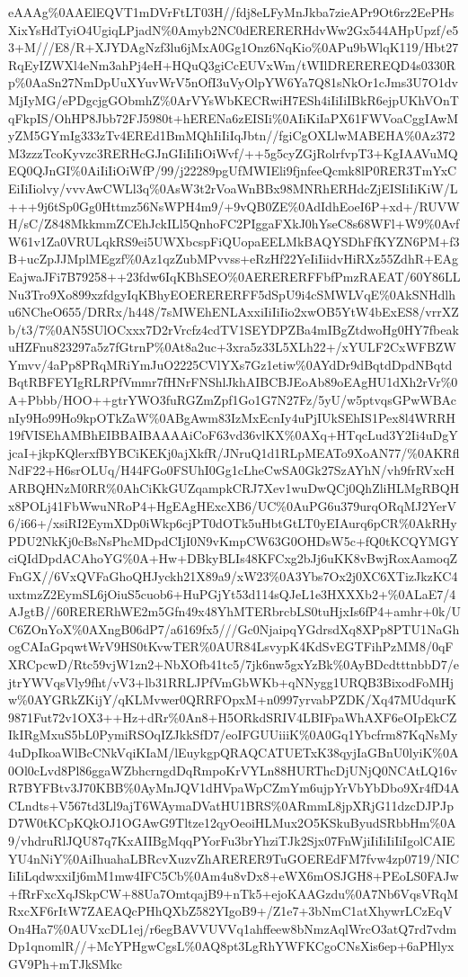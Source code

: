 \documentclass[]{article}
\begin{document}
eAAAg\%0AAElEQVT1mDVrFtLT03H//fdj8eLFyMnJkba7zieAPr9Ot6rz2EePHsXixYsHdTyiO4UgiqLPjadN\%0Amyb2NC0dERERERHdvWw2Gx544AHpUpzf/e53+M///E8/R+XJYDAgNzf3lu6jMxA0Gg1Onz6NqKio\%0APu9bWlqK119/Hbt27RqEyIZWXl4eNm3ahPj4eH+HQuQ3giCcEUVxWm/tWIlDREREREQD4s0330Rp\%0AaSn27NmDpUuXYuvWrV5nOfI3uVyOlpYW6Ya7Q81sNkOr1cJms3U7O1dvMjIyMG/ePDgcjgGObmhZ\%0ArVYsWbKECRwiH7ESh4iIiIiIBkR6ejpUKhVOnTqFkpIS/OhHP8Jbb72FJ5980t+hERENa6zEISIi\%0AIiKiIaPX61FWVoaCggIAwMyZM5GYmIg333zTv4EREd1BmMQhIiIiIqJbtn//fgiCgOXLlwMABEHA\%0Az372M3zzzTcoKyvzc3RERHcGJnGIiIiIiOiWvf/++5g5cyZGjRolrfvpT3+KgIAAVuMQEQ0QJnGI\%0AiIiIiOiWfP/99/j22289pgUfMWIEli9fjnfeeQcmk8lP0RER3TmYxCEiIiIiolvy/vvvAwCWLl3q\%0AsW3t2rVoaWnBBx98MNRhERHdcZjEISIiIiKiW/L+++9j6tSp0Gg0Httmz56NsWPH4m9/+9vQB0ZE\%0AdIdhEoeI6P+xd+/RUVWH/sC/Z848MkkmmZCEhJckILl5QnhoFC2PIggaFXkJ0hYseC8s68WFl+W9\%0AvfW61v1Za0VRULqkRS9ei5UWXbcspFiQUopaEELMkBAQYSDhFfKYZN6PM+f3B+ucZpJJMplMEgzf\%0Az1qzZubMPvvss+eRzHf22YeIiIiidvHiRXz55ZdhR+EAgEajwaJFi7B79258++23fdw6IqKBhSEO\%0AERERERFFbfPmzRAEAT/60Y86LLNu3Tro9Xo899xzfdgyIqKBhyEOERERERFF5dSpU9i4cSMWLVqE\%0AkSNHdlhu6NCheO655/DRRx/h448/7sMWEhENLAxxiIiIiIio2xwOB5YtW4bExES8/vrrXZb/t3/7\%0AN5SUlOCxxx7D2rVrcfz4cdTV1SEYDPZBa4mIBgZtdwoHg0HY7fbeakuHZFnu823297a5z7fGtrnP\%0At8a2uc+3xra5z33L5XLh22+/xYULF2CxWFBZWYmvv/4aPp8PRqMRiYmJuO2225CVlYXs7Gz1etiw\%0AYdDr9dBqtdDpdNBqtdBqtRBFEYIgRLRPfVmmr7fHNrFNShlJkhAIBCBJEoAb89oEAgHU1dXh2rVr\%0A+Pbbb/HOO++gtrYWO3fuRGZmZpf1Go1G7N27Fz/5yU/w5ptvqsGPwWBAcnIy9Ho99Ho9kpOTkZaW\%0ABgAwm83IzMxEcnIy4uPjIUkSEhIS1Pex8l4WRRH19fVISEhAMBhEIBBAIBAAAAiCoF63vd36vlKX\%0AXq+HTqcLud3Y2Ii4uDgYjcaI+jkpKQlerxfBYBCiKEKj0ajXkfR/JNruQ1d1RLpMEATo9XoAN77/\%0AKRflNdF22+H6srOLUq/H44FGo0FSUhI0Gg1cLheCwSA0Gk27SzAYhN/vh9frRVxcHARBQHNzM0RR\%0AhCiKkGUZqampkCRJ7Xev1wuDwQCj0QhZliHLMgRBQHx8POLj41FbWwuNRoP4+HgEAgHExcXB6/UC\%0AuPG6u379urqORqMJ2YerV6/i66+/xsiRI2EymXDp0iWkp6cjPT0dOTk5uHbtGtLT0yEIAurq6pCR\%0AkRHyPDU2NkKj0cBsNsPhcMDpdCIjI0N9vKmpCW63G0OHDsW5c+fQ0tKCQYMGYciQIdDpdACAhoYG\%0A+Hw+DBkyBLIs48KFCxg2bJj6uKK8vBwjRoxAamoqZFnGX//6VxQVFaGhoQHJyckh21X89a9/xW23\%0A3Ybs7Ox2j0XC6XTizJkzKC4uxtmzZ2EymSL6jOiuS5cuob6+HuPGjYt53d114sQJeL1e3HXXXb2+\%0ALaE7/4AJgtB//60RERERhWE2m5Gfn49x48YhMTERbrcbLS0tuHjxIs6fP4+amhr+0k/UC6ZOnYoX\%0AXngB06dP7/a6169fx5///Gc0NjaipqYGdrsdXq8XPp8PTU1NaGhogCAIaGpqwtWrV9HS0tKvwTER\%0AUR84LsvypK4KdSvEGTFihPzMM8/0qFXRCpcwD/Rtc59vjW1zn2+NbXOfb41tc5/7jk6nw5gxYzBk\%0AyBDcdtttnbbD7/ejtrYWVqsVly9fht/vV3+lb31RRLJPfVmGbWKb+qNNygg1URQB3BixodFoMHjw\%0AYGRkZKijY/qKLMvwer0QRRFOpxM+n0997yrvabPZDK/Xq47MUdqurK9871Fut72v1OX3++Hz+dRr\%0An8+H5ORkdSRIV4LBIFpaWhAXF6eOIpEkCZIkIRgMxuS5bL0PymiRSOqIZJkkSfD7/eoIFGUUiiiK\%0A0Gq1Ybcfrm87KqNsMy4uDpIkoaWlBcCNkVqiKIaM/lEuykgpQRAQCATUETxK38qyjIaGBnU0lyiK\%0A0Ol0cLvd8Pl86ggaWZbhcrngdDqRmpoKrVYLn88HURThcDjUNjQ0NCAtLQ16vR7BYFBtv3J70KBB\%0AyMnJQV1dHVpaWpCZmYm6ujpYrVbYbDbo9Xr4fD4ACLndts+V567td3Ll9ajT6WAymaDVatHU1BRS\%0ARmmL8jpXRjG11dzcDJPJpD7W0tKCpKQkOJ1OGAwG9Tltze12qyOeoiHLMux2O5KSkuByudSRbbHm\%0A9/vhdruRlJQU87q7KxAIIBgMqqPYorFu3brYhziTJk2Sjx07FnWjiIiIiIiIiIgolCAIEYU4nNiY\%0AiIhuahaLBRcvXuzvZhARERER9TuGOEREdFM7fvw4zp0719/NICIiIiLqdwxxiIj6mM1mw4IFC5Cb\%0Am4u8vDx8+eWX6mOSJGH8+PEoLS0FAJw+fRrFxcXqJSkpCW+88Ua7OmtqajB9+nTk5+ejoKAAGzdu\%0A7Nb6VqsVRqMRxcXF6rItW7ZAEAQcPHhQXbZ582YIgoB9+/Z1e7+3bNmC1atXhywrLCzEqVOn4Ha7\%0AUVxcDL1ej/r6egBAVVUVVq1ahffeew8bNmzAqlWrcO3atQ7rd7vdmDp1qnomlR//+McYPHgwCgsL\%0AQ8pt3LgRhYWFKCgoCNsXis6ep+6aPHlyxGV9Ph+mTJkSMkc
\end{document}
